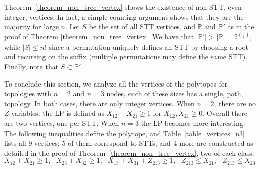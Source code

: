 \begin{remark}
\label{remark_most_integer_vertices_are_non_stt}
Theorem~\ref{theorem_non_tree_vertex} shows the existence of non-STT, even integer, vertices. In fact, a simple counting argument shows that they are the majority for large $n$.
Let $S$ be the set of all STT vertices, and $\mathbb{P}$ and $\mathbb{P}'$ as in the proof of Theorem \ref{theorem_non_tree_vertex}. We have that $|\mathbb{P}'| > |\mathbb{P}| = 2^{\binom{n}{2}}$, while $|S| \le n!$ since a permutation uniquely defines an STT by choosing a root and recursing on the suffix (multiple permutations may define the same STT). Finally, note that $S \subset \mathbb{P}'$.
\end{remark}


To conclude this section, we analyze all the vertices of the polytopes for topologies with $n=2$ and $n=3$ nodes, each of these sizes has a single, path, topology. In both cases, there are only integer vertices. When $n=2$, there are no $Z$ variables, the LP is defined as $X_{12}+X_{21} \ge 1$ for $X_{12},X_{21} \ge 0$. Overall there are two vertices, one per STT. When $n=3$ the LP becomes more interesting. The following inequalities define the polytope, and Table~\ref{table_vertices_n3} lists all $9$ vertices: $5$ of them correspond to STTs, and $4$ more are constructed as detailed in the proof of Theorem~\ref{theorem_non_tree_vertex}, two of each class.
\begin{equation*}
    X_{12}+X_{21} \ge 1, \ \ \ 
    X_{23}+X_{32} \ge 1,  \ \ \ 
    X_{13}+X_{31}+Z_{213} \ge 1,  \ \ \ 
    Z_{213} \le X_{21},  \ \ \ 
    Z_{213} \le X_{23}  \ \ \ 
\end{equation*}

